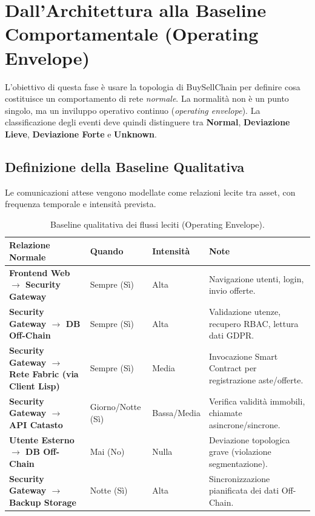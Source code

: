 \documentclass[12pt,a4paper]{article}
\begin{document}
\newpage

\section{Dall'Architettura alla Baseline Comportamentale (Operating Envelope)}
L'obiettivo di questa fase è usare la topologia di BuySellChain per definire cosa costituisce un comportamento di rete \textit{normale}.  
La normalità non è un punto singolo, ma un inviluppo operativo continuo (\textit{operating envelope}).  
La classificazione degli eventi deve quindi distinguere tra \textbf{Normal}, \textbf{Deviazione Lieve}, \textbf{Deviazione Forte} e \textbf{Unknown}.

\subsection{Definizione della Baseline Qualitativa}
Le comunicazioni attese vengono modellate come relazioni lecite tra asset, con frequenza temporale e intensità prevista.

\begin{table}[h]
\centering
\small
\renewcommand{\arraystretch}{1.4}
\begin{tabularx}{\textwidth}{>{\hsize=0.30\hsize\bfseries}X >{\hsize=0.17\hsize}X >{\hsize=0.13\hsize}X >{\hsize=0.40\hsize}X}
\toprule
Relazione Normale & Quando & Intensità & Note \\
\midrule
Frontend Web \(\rightarrow\) Security Gateway & Sempre (Sì) & Alta & Navigazione utenti, login, invio offerte. \\
Security Gateway \(\rightarrow\) DB Off-Chain & Sempre (Sì) & Alta & Validazione utenze, recupero RBAC, lettura dati GDPR. \\
Security Gateway \(\rightarrow\) Rete Fabric (via Client Lisp) & Sempre (Sì) & Media & Invocazione Smart Contract per registrazione aste/offerte. \\
Security Gateway \(\rightarrow\) API Catasto & Giorno/Notte (Sì) & Bassa/Media & Verifica validità immobili, chiamate asincrone/sincrone. \\
Utente Esterno \(\rightarrow\) DB Off-Chain & Mai (No) & Nulla & Deviazione topologica grave (violazione segmentazione). \\
Security Gateway \(\rightarrow\) Backup Storage & Notte (Sì) & Alta & Sincronizzazione pianificata dei dati Off-Chain. \\
\bottomrule
\end{tabularx}
\caption{Baseline qualitativa dei flussi leciti (Operating Envelope).}
\end{table}
\end{document}
